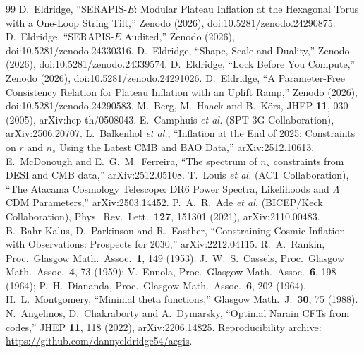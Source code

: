 \documentclass[aps,prd,twocolumn,superscriptaddress,nofootinbib,showkeys]{revtex4-2}
\begin{document}
\begin{thebibliography}{99}
 D.~Eldridge, ``SERAPIS-$E$: Modular Plateau Inflation at the Hexagonal Torus with a One-Loop String Tilt,'' Zenodo (2026), doi:10.5281/zenodo.24290875.
 D.~Eldridge, ``SERAPIS-$E$ Audited,'' Zenodo (2026), doi:10.5281/zenodo.24330316.
 D.~Eldridge, ``Shape, Scale and Duality,'' Zenodo (2026), doi:10.5281/zenodo.24339574.
 D.~Eldridge, ``Lock Before You Compute,'' Zenodo (2026), doi:10.5281/zenodo.24291026.
 D.~Eldridge, ``A Parameter-Free Consistency Relation for Plateau Inflation with an Uplift Ramp,'' Zenodo (2026), doi:10.5281/zenodo.24290583.
 M.~Berg, M.~Haack and B.~K\"ors, JHEP \textbf{11}, 030 (2005), arXiv:hep-th/0508043.
 E.~Camphuis \emph{et al.} (SPT-3G Collaboration), arXiv:2506.20707.
 L.~Balkenhol \emph{et al.}, ``Inflation at the End of 2025: Constraints on $r$ and $n_s$ Using the Latest CMB and BAO Data,'' arXiv:2512.10613.
 E.~McDonough and E.~G.~M.~Ferreira, ``The spectrum of $n_s$ constraints from DESI and CMB data,'' arXiv:2512.05108.
 T.~Louis \emph{et al.} (ACT Collaboration), ``The Atacama Cosmology Telescope: DR6 Power Spectra, Likelihoods and $\Lambda$CDM Parameters,'' arXiv:2503.14452.
 P.~A.~R.~Ade \emph{et al.} (BICEP/Keck Collaboration), Phys.\ Rev.\ Lett.\ \textbf{127}, 151301 (2021), arXiv:2110.00483.
 B.~Bahr-Kalus, D.~Parkinson and R.~Easther, ``Constraining Cosmic Inflation with Observations: Prospects for 2030,'' arXiv:2212.04115.
 R.~A.~Rankin, Proc.\ Glasgow Math.\ Assoc.\ \textbf{1}, 149 (1953).
 J.~W.~S.~Cassels, Proc.\ Glasgow Math.\ Assoc.\ \textbf{4}, 73 (1959); V.~Ennola, Proc.\ Glasgow Math.\ Assoc.\ \textbf{6}, 198 (1964); P.~H.~Diananda, Proc.\ Glasgow Math.\ Assoc.\ \textbf{6}, 202 (1964).
 H.~L.~Montgomery, ``Minimal theta functions,'' Glasgow Math.\ J.\ \textbf{30}, 75 (1988).
 N.~Angelinos, D.~Chakraborty and A.~Dymarsky, ``Optimal Narain CFTs from codes,'' JHEP \textbf{11}, 118 (2022), arXiv:2206.14825.
 Reproducibility archive: \url{https://github.com/dannyeldridge54/aegis}.
\end{thebibliography}
\end{document}
